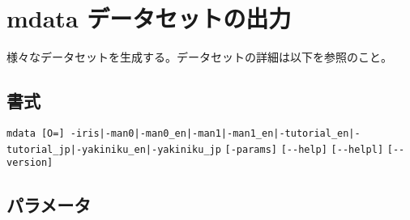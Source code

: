 
%

\section{mdata データセットの出力\label{sect:mdata}}
様々なデータセットを生成する。データセットの詳細は以下を参照のこと。

\subsection*{書式}
\verb/mdata [O=] -iris|-man0|-man0_en|-man1|-man1_en|-tutorial_en|-tutorial_jp|-yakiniku_en|-yakiniku_jp/
\verb|[-params]|
\verb|[--help]|
\verb|[--helpl]|
\verb|[--version]|\\

\subsection*{パラメータ}
